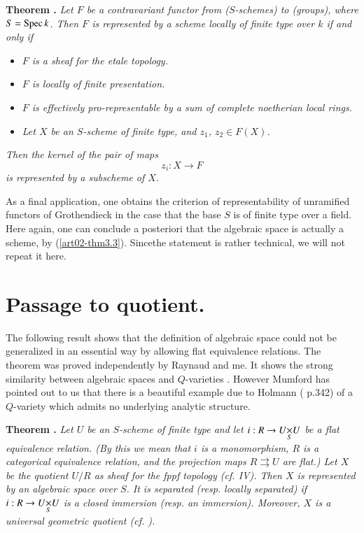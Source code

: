 \medskip
\noindent
{\bf Theorem .\label{art02-thm6.4}}
{\em Let $F$ be a contravariant functor from ($S$-schemes) to (groups), where $S=\operatorname{Spec} k$. Then $F$ is represented by a scheme locally of finite type over $k$ if and only if}
\begin{itemize}
\item[{\rm[0]}] {\em $F$ is a sheaf for the etale topology.}

\item[{\rm[1]}] {\em $F$ is locally of finite presentation.}

\item[{\rm[2]}] {\em $F$ is effectively pro-representable by a sum of complete noetherian local rings.}

\item[{\rm[3]}] {\em Let $X$ be an $S$-scheme of finite type, and $z_{1}$, $z_{2}\in F(X)$.}
\end{itemize}

{\em Then the kernel of the pair of maps}
$$
z_{i}:X\to F
$$
{\em is represented by a subscheme of $X$.}
\smallskip

\noindent
As a final application, one obtains the criterion of representability of unramified functors of Grothendieck \cite{art02-key28} in the case that the base $S$ is of finite type over a field. Here again, one can conclude a posteriori that the algebraic space is actually a scheme, by (\ref{art02-thm3.3}). Since\pageoriginale the statement \cite{art02-key28} is rather technical, we will not repeat it here.

\section{Passage to quotient.}\label{art02-sec7}

The following result shows that the definition of algebraic space could not be generalized in an essential way by allowing flat equivalence relations. The theorem was proved independently by Raynaud \cite{art02-key30} and me. It shows the strong similarity between algebraic spaces and $Q$-varieties \cite{art02-key24}. However Mumford has pointed out to us that there is a beautiful example due to Holmann (\cite{art02-key19} p.342) of a $Q$-variety which admits no underlying analytic structure.

\medskip
\noindent
{\bf Theorem .\label{art02-thm7.1}}
{\em Let $U$ be an $S$-scheme of finite type and let $i:R\to \fprod{U}{U}{S}$ be a flat equivalence relation. (By this we mean that $i$ is a monomorphism, $R$ is a categorical equivalence relation, and the projection maps $R\rightrightarrows U$ are flat.) Let $X$ be the quotient $U/R$ as sheaf for the fppf topology (cf. \cite{art02-key7} IV). Then $X$ is represented by an algebraic space over $S$. It is separated (resp. locally separated) if $i:R\to\fprod{U}{U}{S}$ is a closed immersion (resp. an immersion). Moreover, $X$ is a universal geometric quotient (cf. \cite{art02-key25}).}
\smallskip

